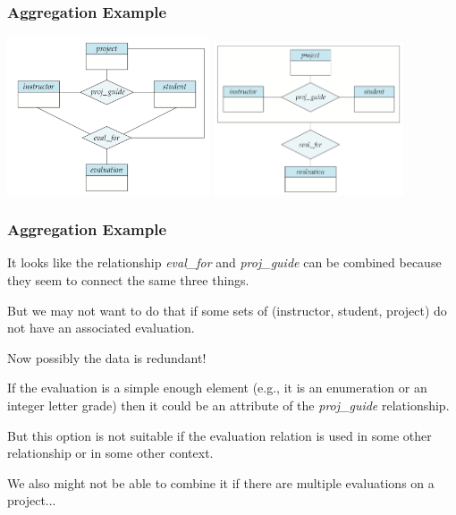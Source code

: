 \begin{frame}
\frametitle{Aggregation Example}

\begin{center}
\includegraphics[width=0.45\textwidth]{images/unaggregated}
\includegraphics[width=0.42\textwidth]{images/aggregation}
\end{center}


\end{frame}



\begin{frame}
\frametitle{Aggregation Example}

It looks like the relationship \textit{eval\_for} and \textit{proj\_guide} can be combined because they seem to connect the same three things. 

But we may not want to do that if some sets of (instructor, student, project) do not have an associated evaluation. 

Now possibly the data is redundant! 

If the evaluation is a simple enough element (e.g., it is an enumeration or an integer letter grade) then it could be an attribute of the \textit{proj\_guide} relationship. 

But this option is not suitable if the evaluation relation is used in some other relationship or in some other context. 

We  also might not be able to combine it if there are multiple evaluations on a project...

\end{frame}



